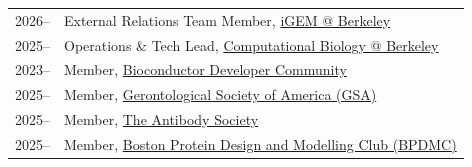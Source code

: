 \begin{longtable}[l]{@{}p{} p{}}

    2026-- & External Relations Team Member, \href{https://igem.studentorg.berkeley.edu/eternals/}{iGEM @ Berkeley} \\

    2025-- & Operations \& Tech Lead, \href{https://compbioatberkeley.com}{Computational Biology @ Berkeley} \\

    2023-- & Member, \href{https://www.bioconductor.org/developers/}{Bioconductor Developer Community} \\
    
    2025-- & Member, \href{https://www.geron.org}{Gerontological Society of America (GSA)} \\

    2025-- & Member, \href{https://www.antibodysociety.org/}{The Antibody Society} \\

    2025-- & Member, \href{https://www.bpdmc.org/}{Boston Protein Design and Modelling Club (BPDMC)} \\

\end{longtable}
